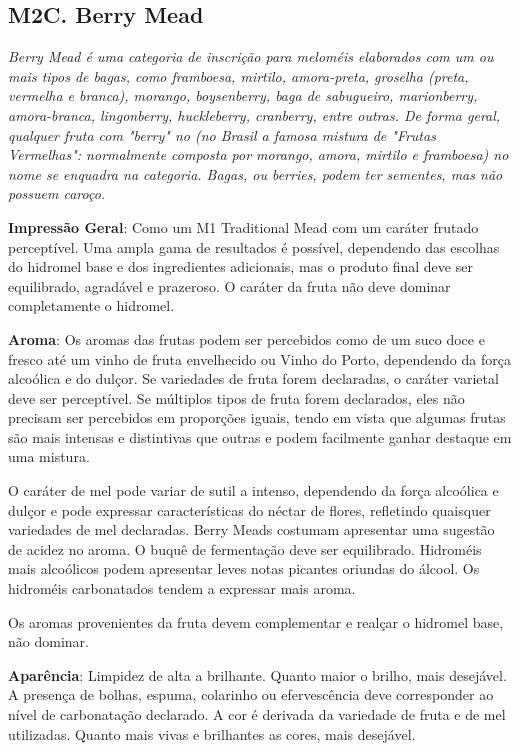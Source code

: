 \subsection*{M2C. Berry Mead}

\textit{Berry Mead é uma categoria de inscrição para meloméis elaborados com um ou mais tipos de bagas, como framboesa, mirtilo, amora-preta, groselha (preta, vermelha e branca), morango, boysenberry, baga de sabugueiro, marionberry, amora-branca, lingonberry, huckleberry, cranberry, entre outras. De forma geral, qualquer fruta com "berry" no (no Brasil a famosa mistura de "Frutas Vermelhas": normalmente composta por morango, amora, mirtilo e framboesa) no nome se enquadra na categoria. Bagas, ou berries, podem ter sementes, mas não possuem caroço.}

\textbf{Impressão Geral}: Como um M1 Traditional Mead com um caráter frutado perceptível. Uma ampla gama de resultados é possível, dependendo das escolhas do hidromel base e dos ingredientes adicionais, mas o produto final deve ser equilibrado, agradável e prazeroso. O caráter da fruta não deve dominar completamente o hidromel.

\textbf{Aroma}: Os aromas das frutas podem ser percebidos como de um suco doce e fresco até um vinho de fruta envelhecido ou Vinho do Porto, dependendo da força alcoólica e do dulçor. Se variedades de fruta forem declaradas, o caráter varietal deve ser perceptível. Se múltiplos tipos de fruta forem declarados, eles não precisam ser percebidos em proporções iguais, tendo em vista que algumas frutas são mais intensas e distintivas que outras e podem facilmente ganhar destaque em uma mistura.

O caráter de mel pode variar de sutil a intenso, dependendo da força alcoólica e dulçor e pode expressar características do néctar de flores, refletindo quaisquer variedades de mel declaradas. Berry Meads costumam apresentar uma sugestão de acidez no aroma. O buquê de fermentação deve ser equilibrado. Hidroméis mais alcoólicos podem apresentar leves notas picantes oriundas do álcool. Os hidroméis carbonatados tendem a expressar mais aroma.

Os aromas provenientes da fruta devem complementar e realçar o hidromel base, não dominar.

\textbf{Aparência}: Limpidez de alta a brilhante. Quanto maior o brilho, mais desejável. A presença de bolhas, espuma, colarinho ou efervescência deve corresponder ao nível de carbonatação declarado. A cor é derivada da variedade de fruta e de mel utilizadas. Quanto mais vivas e brilhantes as cores, mais desejável.

